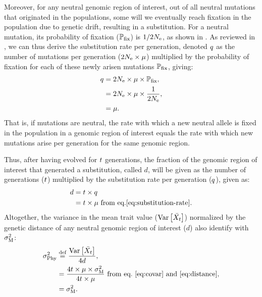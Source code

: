 \documentclass{article}
\begin{document}
Moreover, for any neutral genomic region of interest, out of all neutral mutations that originated in the populations, some will we eventually reach fixation in the population due to genetic drift, resulting in a substitution.
For a neutral mutation, its probability of fixation ($\mathbb{P}_{\text{fix}}$) is $1/2N_{\text{e}}$, as shown in \textcite{kimura_probability_1962}.
As reviewed in \textcite{mccandlish_modeling_2014}, we can thus derive the substitution rate per generation, denoted $q$ as the number of mutations per generation ($2N_{\text{e}} \times \mu$) multiplied by the probability of fixation for each of these newly arisen mutations $\mathbb{P}_{\text{fix}}$, giving:
\begin{align}
    q & = 2 N_{\text{e}} \times \mu \times \mathbb{P}_{\text{fix}}, \\
    & = 2 N_{\text{e}}  \times \mu  \times \dfrac{1}{2N_{\text{e}}}, \\
    & = \mu. \label{eq:substitution-rate}
\end{align}
That is, if mutations are neutral, the rate with which a new neutral allele is fixed in the population in a genomic region of interest equals the rate with which new mutations arise per generation for the same genomic region\cite{kimura_evolutionary_1968}.

Thus, after having evolved for $t$ generations, the fraction of the genomic region of interest that generated a substitution, called $d$, will be given as the number of generations ($t$) multiplied by the substitution rate per generation ($q$), given as:
\begin{align}
    d & = t \times q \\
    & = t \times \mu \text{ from eq.\ref{eq:substitution-rate}}. \label{eq:distance}
\end{align}
Altogether, the variance in the mean trait value ($\operatorname{\text{Var}} \left[\bar{X_{t}}\right]$) normalized by the genetic distance of any neutral genomic region of interest ($d$) also identify with $\sigma^2_{\text{M}}$:
\begin{align}
    \sigma^2_{\text{Phy}} & \stackrel{\text{def}}{=} \frac{\operatorname{\text{Var}} \left[\bar{X_{t}}\right]}{4 d},\\
    & = \frac{4 t \times \mu \times \sigma^2_{\text{M}}}{4 t \times \mu}\text{ from eq.~\ref{eq:covar} and \ref{eq:distance}}, \\
    & = \sigma^2_{\text{M}} \label{eq:rate-phy}.
\end{align}
\end{document}
